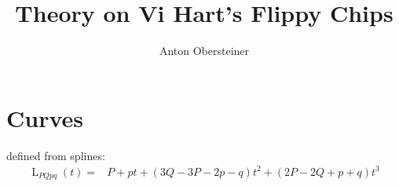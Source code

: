 \documentclass[10pt]{article}
\title{Theory on Vi Hart's Flippy Chips}
\author{Anton Obersteiner}
\newcommand\samplesTikz{10}
\DeclareMathOperator{\Lspline}{L}
\begin{document}
\maketitle

\section{Curves}
    defined from splines:
    $$\begin{aligned}
        \Lspline_{PQpq}(t) =& P + pt + (3Q-3P-2p-q)t^2 + (2P-2Q+p+q)t^3 \\
    \end{aligned}$$
\end{document}
